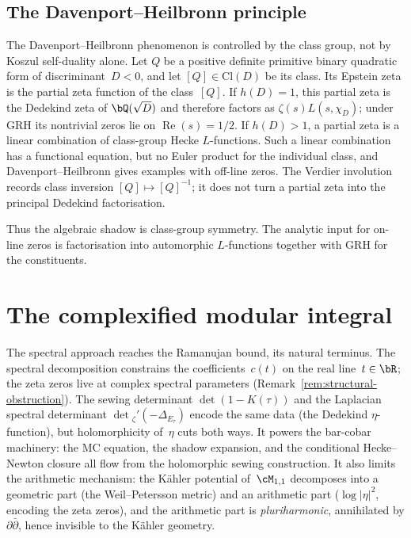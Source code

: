 \subsection{The Davenport--Heilbronn principle}

\begin{remark}%
\label{rem:davenport-heilbronn-koszul}%
\ClaimStatusProvedElsewhere%
%
%
The Davenport--Heilbronn phenomenon is controlled by the class group,
not by Koszul self-duality alone. Let $Q$ be a positive definite
primitive binary quadratic form of discriminant~$D<0$, and let
$[Q]\in\mathrm{Cl}(D)$ be its class. Its Epstein zeta is the partial
zeta function of the class~$[Q]$. If $h(D)=1$, this partial zeta is
the Dedekind zeta of $\bQ(\sqrt D)$ and therefore factors as
$\zeta(s)L(s,\chi_D)$; under GRH its nontrivial zeros lie on
$\operatorname{Re}(s)=1/2$. If $h(D)>1$, a partial zeta is a linear
combination of class-group Hecke $L$-functions. Such a linear
combination has a functional equation, but no Euler product for the
individual class, and Davenport--Heilbronn gives examples with
off-line zeros. The Verdier involution records class inversion
$[Q]\mapsto[Q]^{-1}$; it does not turn a partial zeta into the principal
Dedekind factorisation.

Thus the algebraic shadow is class-group symmetry. The analytic input
for on-line zeros is factorisation into automorphic $L$-functions
together with GRH for the constituents.
\end{remark}

\section{The complexified modular integral}%
\label{sec:complexified-modular-integral}%
%

The spectral approach reaches the
Ramanujan bound, its natural terminus. The spectral
decomposition constrains the coefficients~$c(t)$ on the
real line~$t\in\bR$; the zeta zeros live at
complex spectral parameters
(Remark~\ref{rem:structural-obstruction}). The sewing
determinant $\det(1-K(\tau))$ and the Laplacian spectral
determinant $\det{}_\zeta'(-\Delta_{E_\tau})$ encode the same
data (the Dedekind $\eta$-function), but holomorphicity
of~$\eta$ cuts both ways. It powers the
bar-cobar machinery: the MC equation, the shadow
expansion, and the conditional Hecke--Newton closure all flow from the
holomorphic sewing construction. It also limits
the arithmetic mechanism: the K\"ahler
potential of~$\cM_{1,1}$ decomposes into a geometric part
(the Weil--Petersson metric) and an arithmetic
part ($\log\lvert\eta\rvert^2$, encoding the zeta zeros),
and the arithmetic part is \emph{pluriharmonic},
annihilated by $\partial\bar\partial$, hence invisible
to the K\"ahler geometry.

